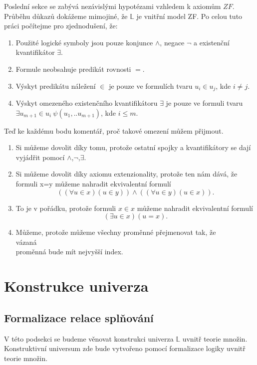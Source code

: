 \documentclass[12pt,a4paper]{article}
\begin{document}
Posledn\'{i} sekce se zab\'{y}v\'{a} nez\'{a}visl\'{y}mi hypot\'{e}zami vzhledem k axiom\r{u}m $ ZF $. Pr\r{u}b\v{e}hu d\r{u}kaz\r{u} dok\'{a}\v{z}eme mimojin\'{e}, \v{z}e $\mathbb{L}$ je vnit\v{r}n\'{i} model ZF. 
\newpage
Po celou tuto pr\'{a}ci po\v{c}\'{i}tejme pro zjednodu\v{s}en\'{i}, \v{z}e:
\begin{enumerate}
  \item Pou\v{z}it\'{e} logick\'{e} symboly jsou pouze konjunce $ \wedge $, negace $ \neg $ a existen\v{c}n\'{i} kvantifik\'{a}tor $ \exists $. 
  \item Formule neobsahuje predik\'{a}t rovnosti $ = $.
  \item V\'{y}skyt predik\'{a}tu n\'{a}le\v{z}en\'{i} $\in$ je pouze ve formul\'{i}ch tvaru $u_i \in u_j$, kde $i \neq j$.
  \item V\'{y}skyt  omezen\'{e}ho existen\v{c}n\'{i}ho kvantifik\'{a}toru $ \exists $ je pouze ve formuli tvaru $ \exists u_{m+1} \in u_i ~ \psi(u_1,..u_{m+1})$, kde $i\leq m $.
\end{enumerate}
Te\v{d} ke ka\v{z}d\'{e}mu bodu koment\'{a}\v{r}, pro\v{c} takov\'{e} omezen\'{i} m\r{u}\v{z}em p\v{r}ijmout.
\begin{enumerate}
  \item  Si m\r{u}\v{z}eme dovolit d\'{i}ky tomu, proto\v{z}e ostatn\'{i} spojky a kvantifik\'{a}tory se daj\'{i} vyj\'{a}d\v{r}it pomoc\'{i} $ \wedge $,$ \neg $,$\exists$. \\
  \item Si m\r{u}\v{z}eme dovolit d\'{i}ky axiomu extenzionality, proto\v{z}e ten n\'{a}m d\'{a}v\'{a}, \v{z}e formuli x=y m\r{u}\v{z}eme nahradit ekvivalentn\'{i} formul\'{i} \[( (\forall u \in x) (u \in y ))\wedge ((\forall u \in y) (u \in x)) .\]
  \item To je v po\v{r}\'{a}dku, proto\v{z}e formuli $x \in x$ m\r{u}\v{z}eme nahradit ekvivalentn\'{i} formul\'{i} \[ (\exists u \in x) (u=x) .\]
  \item M\r{u}\v{z}eme, proto\v{z}e m\r{u}\v{z}eme v\v{s}echny prom\v{e}nn\'{e} p\v{r}ejmenovat tak, \v{z}e v\'{a}zan\'{a}~~~~~~~~~~~~~~~~~~~~~~~~~~~~~~~~~~~~~~~~~~ \\ prom\v{e}nn\'{a} bude m\'{i}t nejvy\v{s}\v{s}\'{i} index. 
\end{enumerate} 
\newpage
\section{Konstrukce univerza} \label{sec:konstrukce}
\subsection{Formalizace relace spl\v{n}ov\'{a}n\'{i}}
V t\'{e}to podsekci se budeme v\v{e}novat konstrukci univerza $\mathbb{L}$ uvnit\v{r} teorie mno\v{z}in. Konstruktivn\'{i} universum zde bude vytvo\v{r}eno pomoc\'{i} formalizace logiky uvnit\v{r} teorie mno\v{z}in. \\
\end{document}
